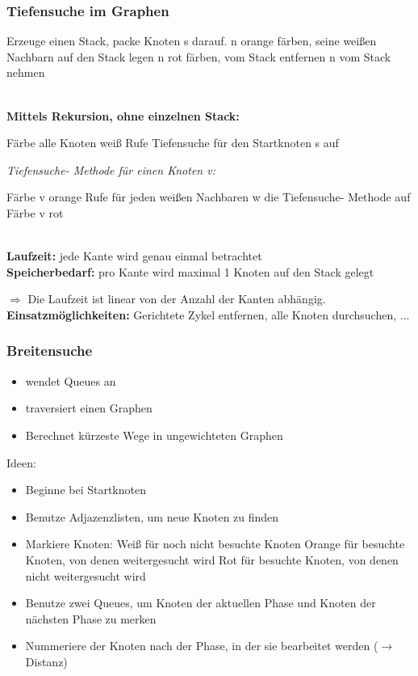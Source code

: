 \documentclass[fleqn]{scrartcl}
\begin{document}
\subsubsection{Tiefensuche im Graphen}
\begin{algorithmic}
\State Erzeuge einen Stack, packe Knoten s darauf.
\State n orange färben, seine weißen Nachbarn auf den Stack legen
\State n rot färben, vom Stack entfernen
\State n vom Stack nehmen
\EndIf
\EndWhile
\end{algorithmic}
$ $\\
\textbf{Mittels Rekursion, ohne einzelnen Stack:}
\begin{algorithmic}
\State Färbe alle Knoten weiß
\State Rufe Tiefensuche für den Startknoten s auf
\end{algorithmic}
\textit{Tiefensuche- Methode für einen Knoten v:}
\begin{algorithmic}
\State Färbe v orange
\State Rufe für jeden weißen Nachbaren w die Tiefensuche- Methode auf
\State Färbe v rot
\end{algorithmic}

$ $\\
\textbf{Laufzeit:} jede Kante wird genau einmal betrachtet\\
\textbf{Speicherbedarf:} pro Kante wird maximal 1 Knoten auf den Stack gelegt

$\Rightarrow$ Die Laufzeit ist linear von der Anzahl der Kanten abhängig.\\
\textbf{Einsatzmöglichkeiten:} Gerichtete Zykel entfernen, alle Knoten durchsuchen, ...

\subsubsection{Breitensuche}
\begin{itemize}
\item wendet Queues an
\item traversiert einen Graphen
\item Berechnet kürzeste Wege in ungewichteten Graphen
\end{itemize}

Ideen:
\begin{itemize}
\item Beginne bei Startknoten
\item Benutze Adjazenzlisten, um neue Knoten zu finden
\item Markiere Knoten:
\subitem Weiß für noch nicht besuchte Knoten
\subitem Orange für besuchte Knoten, von denen weitergesucht wird
\subitem Rot für besuchte Knoten, von denen nicht weitergesucht wird
\item Benutze zwei Queues, um Knoten der aktuellen Phase und Knoten der nächsten Phase zu merken
\item Nummeriere der Knoten nach der Phase, in der sie bearbeitet werden ($\rightarrow$ Distanz)
\end{itemize}
\end{document}
